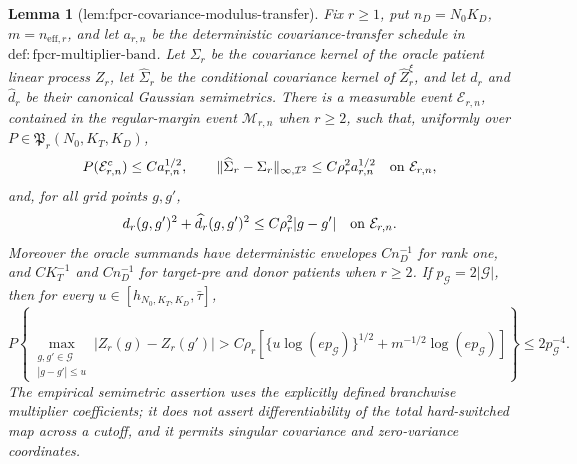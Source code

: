 \documentclass{article}
\newtheorem{lemma}{Lemma}
\begin{document}
\begin{lemma}[lem:fpcr-covariance-modulus-transfer]\label{lem:fpcr-covariance-modulus-transfer}
Fix \(r\ge1\), put \(n_D=N_0K_D\), \(m=n_{\mathrm{eff},r}\), and let
\(a_{r,n}\) be the deterministic covariance-transfer schedule in
\(\mathrm{def:fpcr\mbox{-}multiplier\mbox{-}band}\).  Let \(\Sigma_r\) be
the covariance kernel of the oracle patient linear process \(Z_r\), let
\(\widehat\Sigma_r\) be the conditional covariance kernel of
\(\widehat Z_r^\xi\), and let \(d_r\) and \(\widehat d_r\) be their canonical
Gaussian semimetrics.  There is a measurable event \(\mathcal E_{r,n}\),
contained in the regular-margin event \(\mathcal M_{r,n}\) when \(r\ge2\),
such that, uniformly over \(P\in\mathfrak P_r(N_0,K_T,K_D)\),
\[
 P(\mathcal E_{r,n}^c)\le C a_{r,n}^{1/2},
 \qquad
 \|\widehat\Sigma_r-\Sigma_r\|_{\infty,\mathcal I^2}
 \le C\rho_r^2a_{r,n}^{1/2}\quad\hbox{on }\mathcal E_{r,n},
\]
and, for all grid points \(g,g'\),
\[
 d_r(g,g')^2+\widehat d_r(g,g')^2
 \le C\rho_r^2|g-g'|\quad\hbox{on }\mathcal E_{r,n}.
\]
Moreover the oracle summands have deterministic envelopes \(Cn_D^{-1}\) for
rank one, and \(CK_T^{-1}\) and \(Cn_D^{-1}\) for target-pre and donor
patients when \(r\ge2\).  If \(p_{\mathcal G}=2|\mathcal G|\), then for every
\(u\in[h_{N_0,K_T,K_D},\bar\tau]\),
\[
 P\left\{
 \max_{\substack{g,g'\in\mathcal G\\|g-g'|\le u}}
 |Z_r(g)-Z_r(g')|>
 C\rho_r\left[\{u\log(ep_{\mathcal G})\}^{1/2}
 +m^{-1/2}\log(ep_{\mathcal G})\right]\right\}
 \le 2p_{\mathcal G}^{-4}.
\]
The empirical semimetric assertion uses the explicitly defined branchwise
multiplier coefficients; it does not assert differentiability of the total
hard-switched map across a cutoff, and it permits singular covariance and
zero-variance coordinates.
\end{lemma}
\end{document}
